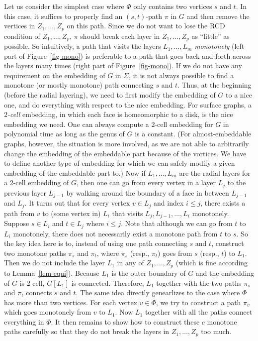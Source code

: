 \documentclass[a4paper,11pt]{article}
\numberwithin{lemma}{section}
\begin{document}
Let us consider the simplest case where $\varPhi$ only contains two vertices $s$ and $t$.
In this case, it suffices to properly find an $(s,t)$-path $\pi$ in $G$ and then remove the vertices in $Z_1,\dots,Z_p$ on this path.
Since we do not want to lose the RCD condition of $Z_1,\dots,Z_p$, $\pi$ should break each layer in $Z_1,\dots,Z_p$ as ``little'' as possible.
So intuitively, a path that visits the layers $L_1,\dots,L_m$ \emph{monotonely} (left part of Figure~\ref{fig-mono}) is preferable to a path that goes back and forth across the layers many times (right part of Figure~\ref{fig-mono}).
If we do not have any requirement on the embedding of $G$ in $\varSigma$, it is not always possible to find a monotone (or mostly monotone) path connecting $s$ and $t$.
Thus, at the beginning (before the radial layering), we need to first modify the embedding of $G$ to a nice one, and do everything with respect to the nice embedding.
For surface graphs, a \emph{$2$-cell} embedding, in which each face is homeomorphic to a disk, is the nice embedding we need.
One can always compute a $2$-cell embedding for $G$ in polynomial time as long as the genus of $G$ is a constant.
(For almost-embeddable graphs, however, the situation is more involved, as we are not able to arbitrarily change the embedding of the embeddable part because of the vortices.
We have to define another type of embedding for which we can safely modify a given embedding of the embeddable part to.)
Now if $L_1,\dots,L_m$ are the radial layers for a 2-cell embedding of $G$, then one can go from every vertex in a layer $L_j$ to the previous layer $L_{j-1}$ by walking around the boundary of a face in between $L_{j-1}$ and $L_j$.
It turns out that for every vertex $v \in L_j$ and index $i \leq j$, there exists a path from $v$ to (some vertex in) $L_i$ that visits $L_j,L_{j-1},\dots,L_i$ monotonely.
Suppose $s \in L_i$ and $t \in L_j$ where $i \leq j$.
Note that although we can go from $t$ to $L_i$ monotonely, there does not necessarily exist a monotone path from $t$ to $s$.
So the key idea here is to, instead of using one path connecting $s$ and $t$, construct two monotone paths $\pi_s$ and $\pi_t$, where $\pi_s$ (resp., $\pi_t$) goes from $s$ (resp., $t$) to $L_1$.
Then we do not include the layer $L_1$ in any of $Z_1,\dots,Z_p$ (which is fine according to Lemma~\ref{lem-equi}).
Because $L_1$ is the outer boundary of $G$ and the embedding of $G$ is 2-cell, $G[L_1]$ is connected.
Therefore, $L_1$ together with the two paths $\pi_s$ and $\pi_t$ connects $s$ and $t$.
The same idea directly genearlizes to the case where $\varPhi$ has more than two vertices.
For each vertex $v \in \varPhi$, we try to construct a path $\pi_v$ which goes monotonely from $v$ to $L_1$.
Now $L_1$ together with all the paths connect everything in $\varPhi$.
It then remains to show how to construct these $c$ monotone paths carefully so that they do not break the layers in $Z_1,\dots,Z_p$ too much.
\end{document}
